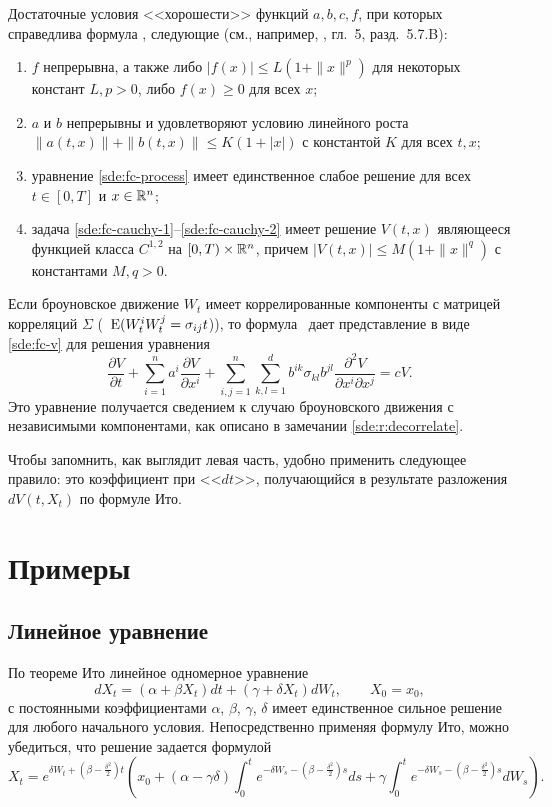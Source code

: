 \begin{remark}
\label{sde:r:fc}
Достаточные условия <<хорошести>> функций $a,b,c,f$, при которых справедлива формула \fc, следующие (см., например, \cite{KaratzasShreve91}, гл.~5, разд.~5.7.B):
\begin{enumerate}
\item $f$ непрерывна, а также либо $|f(x)| \le L(1+ \|x\|^p)$ для некоторых констант $L,p>0$, либо $f(x)\ge 0$ для всех $x$;
\item $a$ и $b$ непрерывны и удовлетворяют условию линейного роста $\|a(t,x)\| + \|b(t,x)\| \le K(1+|x|)$ с константой $K$ для всех $t,x$;
\item уравнение \eqref{sde:fc-process} имеет единственное слабое решение для всех $t\in[0,T]$ и $x\in\mathbb{R}^n$;
\item задача \eqref{sde:fc-cauchy-1}--\eqref{sde:fc-cauchy-2} имеет решение $V(t,x)$ являющееся функцией класса $C^{1,2}$ на $[0,T)\times\mathbb{R}^n$, причем $|V(t,x)| \le M(1+\|x\|^q)$ с константами $M,q>0$.
\end{enumerate}
\end{remark}

\begin{remark}
Если броуновское движение $W_t$ имеет коррелированные компоненты с матрицей корреляций $\Sigma$ (\te\ $\operatorname{E}(W_t^iW_t^j = \sigma_{ij}t$)), то формула \fc\ дает представление в виде \eqref{sde:fc-v} для решения уравнения 
\[
\frac{\partial V}{\partial t} + \sum_{i=1}^n a^i\frac{\partial V}{\partial x^i} + 
\sum_{i,j=1}^n \sum_{k,l=1}^d b^{ik}\sigma_{kl}b^{jl}\frac{\partial^2 V}{\partial x^i \partial x^j} = cV.
\]
Это уравнение получается сведением к случаю броуновского движения с независимыми компонентами, как описано в замечании \ref{sde:r:decorrelate}.

Чтобы запомнить, как выглядит левая часть, удобно применить следующее правило: это коэффициент при <<$dt$>>, получающийся в результате разложения $d V(t,X_t)$ по формуле Ито.
\end{remark}


\section{Примеры}
\subsection{Линейное уравнение}

По теореме Ито линейное одномерное уравнение 
\[
dX_t = (\alpha + \beta X_t)dt + (\gamma + \delta X_t) d W_t, \qquad X_0=x_0,
\]
с постоянными коэффициентами %
$\alpha$, $\beta$, $\gamma$, $\delta$ имеет единственное сильное решение для любого начального условия.
Непосредственно применяя формулу Ито, можно убедиться, что решение задается формулой
\[
X_t = e^{\delta W_t + (\beta-\frac{\delta^2}{2})t}
\left(x_0 + (\alpha - \gamma\delta) \int_0^t e^{-\delta W_s - (\beta-\frac{\delta^2}{2})s} ds
+ \gamma \int_0^t e^{-\delta W_s - (\beta-\frac{\delta^2}{2})s} dW_s\right).
\]


